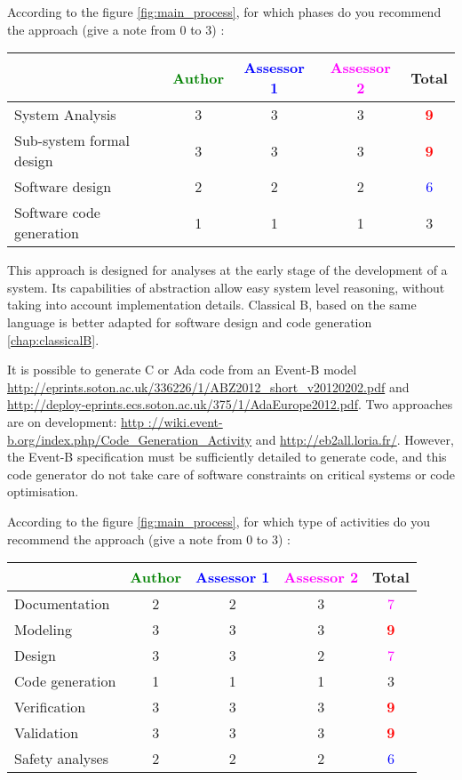 According to the figure \ref{fig:main_process}, for which phases do you recommend the approach (give a note from 0 to  3) :

\begin{tabular}{|l | c | c | c | c|}
\hline
& \textcolor{green}{Author} & \textcolor{blue}{Assessor 1} & \textcolor{magenta}{Assessor 2} & Total \\
\hline 
System Analysis & 3    & 3    & 3    & \textcolor{red}{\textbf{9}} \\
\hline
Sub-system formal design & 3    & 3    & 3    & \textcolor{red}{\textbf{9}} \\
\hline
Software design & 2    & 2    & 2    & \textcolor{blue}{6} \\
\hline
Software code generation & 1    & 1    & 1    & 3    \\
\hline
\end{tabular}

\begin{author_comment}
This approach is designed for analyses at the early stage of the development of a system. Its capabilities of abstraction allow easy system level reasoning, without taking into account implementation details. Classical B, based on the same language is better adapted for software design and code generation \ref{chap:classicalB}.

It is possible to generate C or Ada code from an Event-B model \url{http://eprints.soton.ac.uk/336226/1/ABZ2012_short_v20120202.pdf} and \url{http://deploy-eprints.ecs.soton.ac.uk/375/1/AdaEurope2012.pdf}. Two  approaches are on development: \url{http ://wiki.event-b.org/index.php/Code_Generation_Activity} and \url{http://eb2all.loria.fr/}. However, the Event-B specification must be sufficiently detailed to generate code, and this code generator do not take care of software constraints on critical systems or code optimisation.
\end{author_comment}


According to the figure \ref{fig:main_process}, for which type of activities do you recommend the approach (give a note from 0 to  3) :

\begin{tabular}{|l | c | c | c | c|}
\hline
& \textcolor{green}{Author} & \textcolor{blue}{Assessor 1} & \textcolor{magenta}{Assessor 2} & Total \\
\hline 
Documentation & 2    & 2    & 3    & \textcolor{magenta}{7} \\
\hline
Modeling & 3    & 3    & 3    & \textcolor{red}{\textbf{9}} \\
\hline
Design & 3    & 3    & 2    & \textcolor{magenta}{7} \\
\hline
Code generation & 1    & 1    & 1    & 3    \\
\hline
Verification & 3    & 3    & 3    & \textcolor{red}{\textbf{9}} \\
\hline
Validation & 3    & 3    & 3    & \textcolor{red}{\textbf{9}} \\
\hline
Safety analyses & 2    & 2    & 2    & \textcolor{blue}{6} \\
\hline
\end{tabular}

